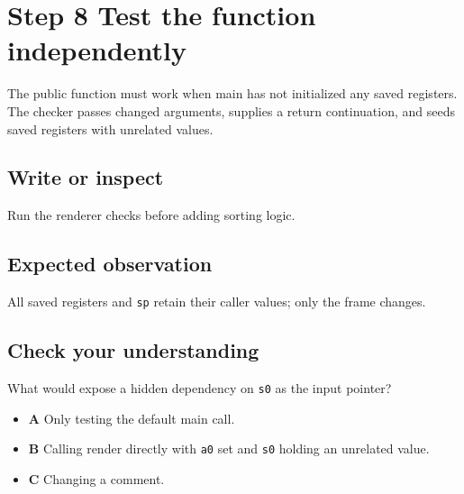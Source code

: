 \section{Step 8 Test the function
  independently}\label{009-sorting-visualizer-s08-step-8-test-the-function-independently}

The public function must work when main has not initialized any saved
registers. The checker passes changed arguments, supplies a return
continuation, and seeds saved registers with unrelated values.

\subsection{Write or
  inspect}\label{009-sorting-visualizer-s08-write-or-inspect}

Run the renderer checks before adding sorting logic.

\subsection{Expected
  observation}\label{009-sorting-visualizer-s08-expected-observation}

All saved registers and \texttt{sp} retain their caller values; only the
frame changes.

\subsection{Check your
  understanding}\label{009-sorting-visualizer-s08-check-your-understanding}

What would expose a hidden dependency on \texttt{s0} as the input
pointer?

\begin{itemize}
  \tightlist
  \item
        \textbf{A} Only testing the default main call.
  \item
        \textbf{B} Calling render directly with \texttt{a0} set and
        \texttt{s0} holding an unrelated value.
  \item
        \textbf{C} Changing a comment.
\end{itemize}
